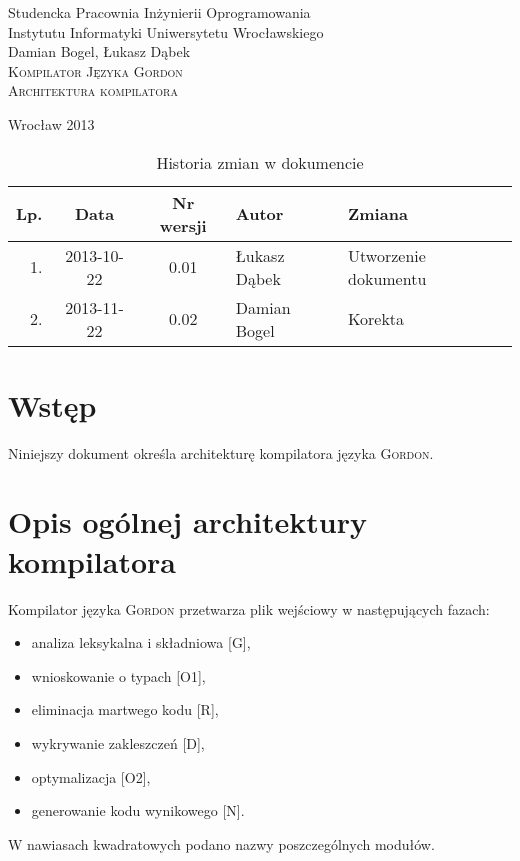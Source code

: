 \documentclass{documentation}
\begin{document}
\begin{titlepage}
\begin{center}
Studencka Pracownia Inżynierii Oprogramowania\\
Instytutu Informatyki Uniwersytetu Wrocławskiego\\[6cm]

Damian Bogel, Łukasz Dąbek\\[1cm]
\textsc{\LARGE Kompilator Języka Gordon}\\[0.5cm]
\textsc{\large Architektura kompilatora}

\vfill
Wrocław 2013 \\[2.5cm]

\end{center}
\end{titlepage}

\newpage
\begin{table}
	\centering
    \captionsetup{name=Tabela}
	\caption{Historia zmian w dokumencie}
		\begin{tabular}{|r|c|c|l|l|}
		\hline
		Lp.  & Data       & Nr wersji & Autor                 & Zmiana \\ \hline
		1.   & 2013-10-22 & 0.01 & Łukasz Dąbek & Utworzenie dokumentu \\ \hline
		2.   & 2013-11-22 & 0.02 & Damian Bogel & Korekta \\ \hline
	\end{tabular}
\end{table}
\newpage

\tableofcontents
\setcounter{page}{2}

\newpage

\section{Wstęp}
\noindent Niniejszy dokument określa architekturę kompilatora języka
\textsc{Gordon}.

\section{Opis ogólnej architektury kompilatora}
\noindent Kompilator języka \textsc{Gordon} przetwarza plik wejściowy w
następujących fazach:
\begin{itemize}
    \item analiza leksykalna i składniowa [G],
    \item wnioskowanie o typach [O1],
    \item eliminacja martwego kodu [R],
    \item wykrywanie zakleszczeń [D], 
    \item optymalizacja [O2],
    \item generowanie kodu wynikowego [N].
\end{itemize}
W nawiasach kwadratowych podano nazwy poszczególnych modułów.
\end{document}
